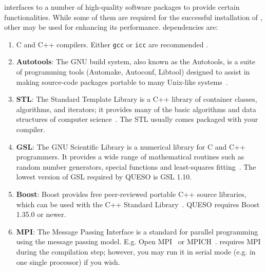 \Queso{} interfaces to a number of high-quality software packages to provide certain functionalities. While some of them are required for the successful installation of \Queso{}, other may be used for enhancing its performance. 
%
\Queso{} dependencies are:
\begin{enumerate}%

  \item C and C++ compilers. Either \texttt{gcc} or \texttt{icc} are recommended \cite{GCC,ICC}.
  
  \item \textbf{Autotools}: The GNU build system, also known as the Autotools, is a suite of programming tools (Automake, Autoconf, Libtool) designed to assist in making source-code packages portable to many Unix-like systems~\cite{Autotools}.
  
  \item \textbf{STL}: The Standard Template Library is a C++ library of container classes, algorithms, and iterators; it provides many of the basic algorithms and data structures of computer science~\cite{STL}. The STL usually comes packaged with your compiler.

  \item \textbf{GSL}: The GNU Scientific Library is a numerical library for C and C++ programmers. It provides a wide range of mathematical routines such as random number generators, special functions and least-squares fitting~\cite{Gsl}. The lowest version of GSL required by QUESO is GSL 1.10.

  \item \textbf{Boost}: Boost provides free peer-reviewed portable C++ source libraries, which can be used with the C++ Standard Library~\cite{Boost}. QUESO requires Boost 1.35.0 or newer.

  \item \textbf{MPI}: The Message Passing Interface is a standard for parallel programming using the message passing model. E.g. Open MPI~\cite{Openmpi} or MPICH~\cite{Mpich}. \Queso{} requires MPI during the compilation step; however, you may run it in serial mode (e.g. in one single processor) if you wish. %

\end{enumerate}%

% 


